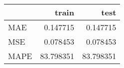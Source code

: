 \begin{tabular}{lrr}
\toprule
{} &      train &       test \\
\midrule
MAE  &   0.147715 &   0.147715 \\
MSE  &   0.078453 &   0.078453 \\
MAPE &  83.798351 &  83.798351 \\
\bottomrule
\end{tabular}
